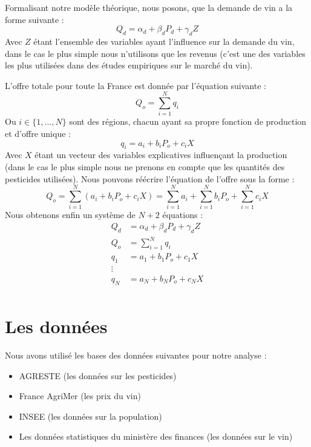 \documentclass[11pt, a4paper]{article}
\begin{document}
Formalisant notre modèle théorique, nous posons, que la demande de vin a la forme suivante :
\begin{equation}
    Q_d = \alpha_d + \beta_d P_d + \gamma_d Z 
\end{equation}
Avec $Z$ étant l'ensemble des variables ayant l'influence sur la demande du vin, dans le cas le plus simple nous n'utilisons que les revenus (c'est une des variables les plus utilisées dans des études empiriques sur le marché du vin).
\par
L'offre totale pour toute la France est donnée par l'équation suivante : 
\begin{equation}
    Q_o = \sum_{i = 1}^{N} q_i
\end{equation}
Ou $i \in \{1, ..., N\}$ sont des régions, chacun ayant sa propre fonction de production et d'offre unique : 
\begin{equation}
    q_i = a_i + b_i P_o + c_i X
\end{equation}
Avec $X$ étant un vecteur des variables explicatives influençant la production (dans le cas le plus simple nous ne prenons en compte que les quantités des pesticides utilisées).
Nous pouvons réécrire l'équation de l'offre sous la forme :
\begin{equation}
    Q_o = \sum_{i = 1}^{N} (a_i + b_i P_o + c_i X) = \sum_{i = 1}^{N} a_i + \sum_{i = 1}^{N} b_i P_o + \sum_{i = 1}^{N} c_i X
\end{equation}
Nous obtenons enfin un système de $N + 2$ équations : 
\begin{align*}
    Q_d & = \alpha_d + \beta_d P_d + \gamma_d Z \\
    Q_o & = \sum_{i = 1}^{N} q_i \\
    q_1 & = a_1 + b_1 P_o + c_1 X \\ 
    \vdots \\ 
    q_N & = a_N + b_N P_o + c_N X \\
\end{align*}

\section*{Les données}
Nous avons utilisé les bases des données suivantes pour notre analyse :
\begin{itemize}
    \item AGRESTE (les données sur les pesticides)
    \item France AgriMer (les prix du vin)
    \item INSEE (les données sur la population)
    \item Les données statistiques du ministère des finances (les données sur le vin)
\end{itemize}
\end{document}
